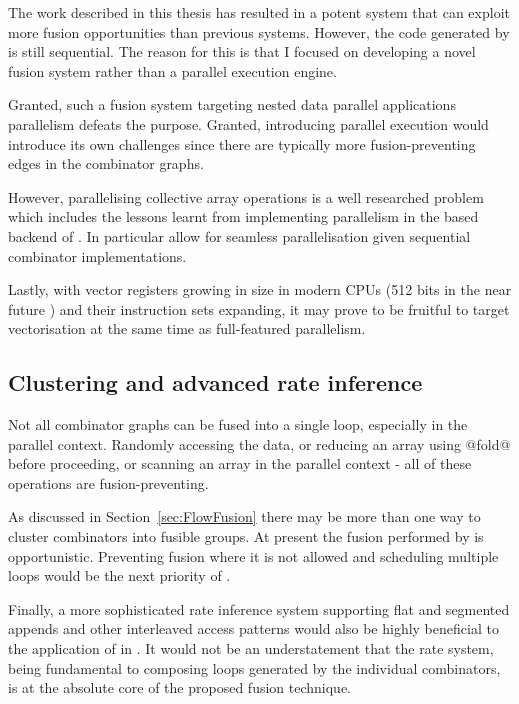 \documentclass[preamble.tex]{subfiles}
\begin{document}
The work described in this thesis has resulted in a potent system that can exploit more fusion opportunities than previous systems. However, the code generated by \LiveFusion is still sequential. The reason for this is that I focused on developing a novel fusion system rather than a parallel execution engine.

Granted, such a fusion system targeting nested data parallel applications parallelism defeats the purpose. Granted, introducing parallel execution would introduce its own challenges since there are typically more fusion-preventing edges in the combinator graphs.

However, parallelising collective array operations is a well researched problem which includes the lessons learnt from implementing parallelism in the \StreamFusion based backend of \DPH. In particular  \cite{CLP+07} allow for seamless parallelisation given sequential combinator implementations.

Lastly, with vector registers growing in size in modern CPUs (512 bits in the near future \cite{IntelISA}) and their instruction sets expanding, it may prove to be fruitful to target vectorisation at the same time as full-featured parallelism.



\subsection{Clustering and advanced rate inference}

Not all combinator graphs can be fused into a single loop, especially in the parallel context. Randomly accessing the data, or reducing an array using @fold@ before proceeding, or scanning an array in the parallel context - all of these operations are fusion-preventing.

As discussed in Section~\ref{sec:FlowFusion} there may be more than one way to cluster combinators into fusible groups. At present the fusion performed by \LiveFusion is opportunistic. Preventing fusion where it is not allowed and scheduling multiple loops would be the next priority of \LiveFusion.

Finally, a more sophisticated rate inference system supporting flat and segmented appends and other interleaved access patterns would also be highly beneficial to the application of \LiveFusion in \DPH. It would not be an understatement that the rate system, being fundamental to composing loops generated by the individual combinators, is at the absolute core of the proposed fusion technique.






\IfNotCompilingAll{}
\end{document}
